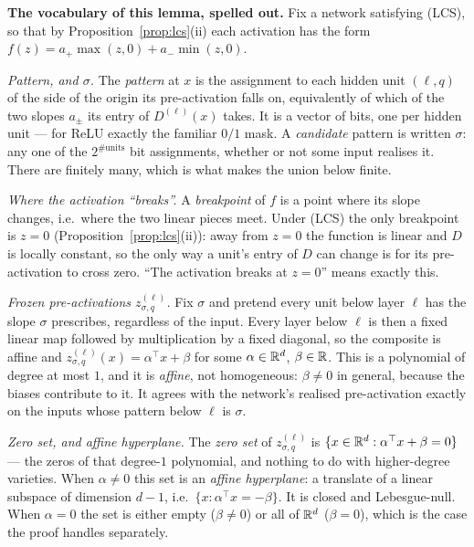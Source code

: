 \begin{clarifybox}
\textbf{The vocabulary of this lemma, spelled out.} Fix a network satisfying
(LCS), so that by Proposition~\ref{prop:lcs}(ii) each activation has the form
$f(z)=a_+\max(z,0)+a_-\min(z,0)$.

\emph{Pattern, and $\sigma$.} The \emph{pattern} at $x$ is the assignment to
each hidden unit $(\ell,q)$ of the side of the origin its pre-activation falls
on, equivalently of which of the two slopes $a_\pm$ its entry of $D^{(\ell)}(x)$
takes. It is a vector of bits, one per hidden unit --- for ReLU exactly the
familiar $0/1$ mask. A \emph{candidate} pattern is written $\sigma$: any one of
the $2^{\#\mathrm{units}}$ bit assignments, whether or not some input realises
it. There are finitely many, which is what makes the union below finite.

\emph{Where the activation ``breaks''.} A \emph{breakpoint} of $f$ is a point
where its slope changes, i.e.\ where the two linear pieces meet. Under (LCS)
the only breakpoint is $z=0$ (Proposition~\ref{prop:lcs}(ii)): away from $z=0$
the function is linear and $D$ is locally constant, so the only way a unit's
entry of $D$ can change is for its pre-activation to cross zero. ``The
activation breaks at $z=0$'' means exactly this.

\emph{Frozen pre-activations $z^{(\ell)}_{\sigma,q}$.} Fix $\sigma$ and pretend
every unit below layer $\ell$ has the slope $\sigma$ prescribes, regardless of
the input. Every layer below $\ell$ is then a fixed linear map followed by
multiplication by a fixed diagonal, so the composite is affine and
$z^{(\ell)}_{\sigma,q}(x)=\alpha^\top x+\beta$ for some $\alpha\in\mathbb{R}^d$,
$\beta\in\mathbb{R}$. This is a polynomial of degree at most $1$, and it is
\emph{affine}, not homogeneous: $\beta\neq0$ in general, because the biases
contribute to it. It agrees with the network's realised pre-activation exactly
on the inputs whose pattern below $\ell$ is $\sigma$.

\emph{Zero set, and affine hyperplane.} The \emph{zero set} of
$z^{(\ell)}_{\sigma,q}$ is $\{x\in\mathbb{R}^d: \alpha^\top x+\beta=0\}$ --- the zeros
of that degree-$1$ polynomial, and nothing to do with higher-degree varieties.
When $\alpha\neq0$ this set is an \emph{affine hyperplane}: a translate of a
linear subspace of dimension $d-1$, i.e.\ $\{x:\alpha^\top x=-\beta\}$. It is
closed and Lebesgue-null. When $\alpha=0$ the set is either empty ($\beta\neq0$)
or all of $\mathbb{R}^d$ ($\beta=0$), which is the case the proof handles separately.


\end{clarifybox}
